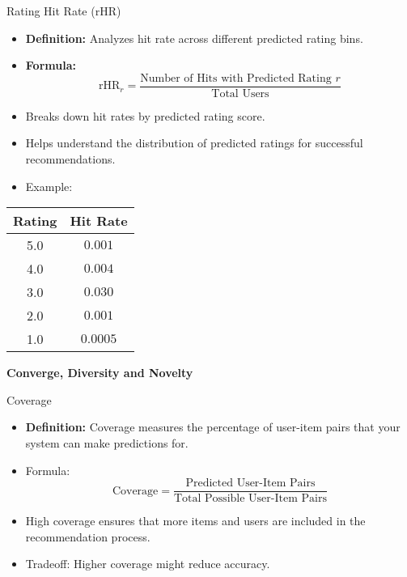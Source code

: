 \documentclass{beamer}
\begin{document}
\begin{frame}{Rating Hit Rate (rHR)}
\begin{itemize}
    \item \textbf{Definition:} Analyzes hit rate across different predicted rating bins.
    \item \textbf{Formula:}
    \[
    \text{rHR}_r = \frac{\text{Number of Hits with Predicted Rating } r}{\text{Total Users}}
    \]
    \item Breaks down hit rates by predicted rating score.
    \item Helps understand the distribution of predicted ratings for successful recommendations.
    \item Example:
\end{itemize}

\begin{center}
\begin{tabular}{|c|c|}
\hline
\textbf{Rating} & \textbf{Hit Rate} \\ \hline
5.0 & \( 0.001 \) \\ \hline
4.0 & \( 0.004 \) \\ \hline
3.0 & \( 0.030 \) \\ \hline
2.0 & \( 0.001 \) \\ \hline
1.0 & \( 0.0005 \) \\ \hline
\end{tabular}
\end{center}
\end{frame}

\begin{frame}[plain]
    \begin{center}
        {\LARGE \textbf{Converge, Diversity and Novelty}}
    \end{center}
\end{frame}

\begin{frame}{Coverage}
\begin{itemize}
    \item \textbf{Definition:} Coverage measures the percentage of user-item pairs that your system can make predictions for.
    \item Formula:
    \[
    \text{Coverage} = \frac{\text{Predicted User-Item Pairs}}{\text{Total Possible User-Item Pairs}}
    \]
    \item High coverage ensures that more items and users are included in the recommendation process.
    \item Tradeoff: Higher coverage might reduce accuracy.
\end{itemize}
\end{frame}
\end{document}
